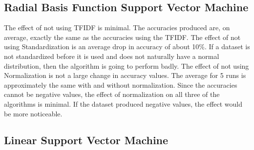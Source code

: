 \documentclass[conference]{IEEEtran}
\begin{document}
%
%
%


\subsection{Radial Basis Function Support Vector Machine}

The effect of not using TFIDF is minimal. The accuracies produced are, on average, exactly the same as the accuracies using the TFIDF.
The effect of not using Standardization is an average drop in accuracy of about 10\%. If a dataset is not standardized before it is used and does not naturally have a normal distribution, then the algorithm is going to perform badly. 
The effect of not using Normalization is not a large change in accuracy values. The average for 5 runs is approximately the same with and without normalization. Since the accuracies cannot be negative values, the effect of normalization on all three of the algorithms is minimal. If the dataset produced negative values, the effect would be more noticeable. 

\subsection{Linear Support Vector Machine}
\end{document}
